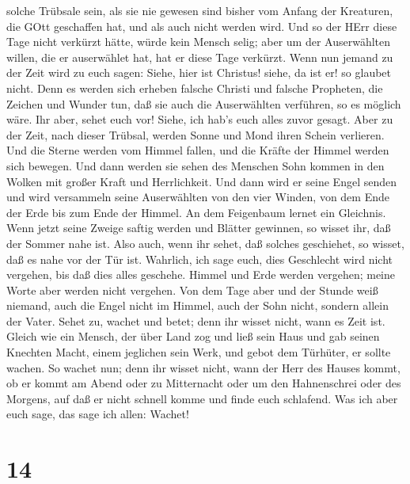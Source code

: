 solche Trübsale sein, als sie nie gewesen sind bisher vom Anfang der
Kreaturen, die GOtt geschaffen hat, und als auch nicht werden wird.
 Und so der HErr diese Tage nicht verkürzt hätte, würde
kein Mensch selig; aber um der Auserwählten willen, die er auserwählet
hat, hat er diese Tage verkürzt.  Wenn nun jemand zu der
Zeit wird zu euch sagen: Siehe, hier ist Christus! siehe, da ist er! so
glaubet nicht.  Denn es werden sich erheben falsche Christi
und falsche Propheten, die Zeichen und Wunder tun, daß sie auch die
Auserwählten verführen, so es möglich wäre.  Ihr aber,
sehet euch vor! Siehe, ich hab's euch alles zuvor gesagt. 
Aber zu der Zeit, nach dieser Trübsal, werden Sonne und Mond ihren
Schein verlieren.  Und die Sterne werden vom Himmel fallen,
und die Kräfte der Himmel werden sich bewegen.  Und dann
werden sie sehen des Menschen Sohn kommen in den Wolken mit großer Kraft
und Herrlichkeit.  Und dann wird er seine Engel senden und
wird versammeln seine Auserwählten von den vier Winden, von dem Ende der
Erde bis zum Ende der Himmel.  An dem Feigenbaum lernet ein
Gleichnis. Wenn jetzt seine Zweige saftig werden und Blätter gewinnen,
so wisset ihr, daß der Sommer nahe ist.  Also auch, wenn
ihr sehet, daß solches geschiehet, so wisset, daß es nahe vor der Tür
ist.  Wahrlich, ich sage euch, dies Geschlecht wird nicht
vergehen, bis daß dies alles geschehe.  Himmel und Erde
werden vergehen; meine Worte aber werden nicht vergehen. 
Von dem Tage aber und der Stunde weiß niemand, auch die Engel nicht im
Himmel, auch der Sohn nicht, sondern allein der Vater. 
Sehet zu, wachet und betet; denn ihr wisset nicht, wann es Zeit ist.
 Gleich wie ein Mensch, der über Land zog und ließ sein
Haus und gab seinen Knechten Macht, einem jeglichen sein Werk, und gebot
dem Türhüter, er sollte wachen.  So wachet nun; denn ihr
wisset nicht, wann der Herr des Hauses kommt, ob er kommt am Abend oder
zu Mitternacht oder um den Hahnenschrei oder des Morgens, 
auf daß er nicht schnell komme und finde euch schlafend. 
Was ich aber euch sage, das sage ich allen: Wachet!

\hypertarget{section-13}{%
\section{14}\label{section-13}}

